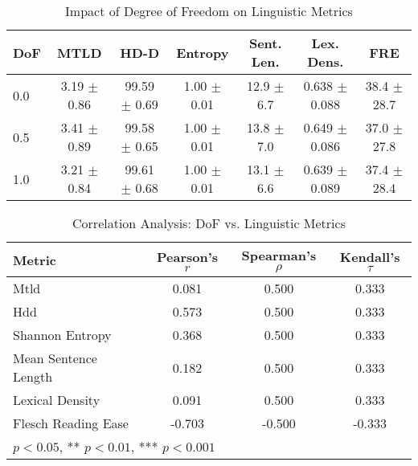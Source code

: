 \begin{table}[htbp]
\centering
\caption{Impact of Degree of Freedom on Linguistic Metrics}
\label{tab:dof_metrics}
\begin{tabular}{lcccccc}
\toprule
DoF & MTLD & HD-D & Entropy & Sent. Len. & Lex. Dens. & FRE \\
\midrule
0.0 & 3.19 $\pm$ 0.86 & 99.59 $\pm$ 0.69 & 1.00 $\pm$ 0.01 & 12.9 $\pm$ 6.7 & 0.638 $\pm$ 0.088 & 38.4 $\pm$ 28.7 \\
0.5 & 3.41 $\pm$ 0.89 & 99.58 $\pm$ 0.65 & 1.00 $\pm$ 0.01 & 13.8 $\pm$ 7.0 & 0.649 $\pm$ 0.086 & 37.0 $\pm$ 27.8 \\
1.0 & 3.21 $\pm$ 0.84 & 99.61 $\pm$ 0.68 & 1.00 $\pm$ 0.01 & 13.1 $\pm$ 6.6 & 0.639 $\pm$ 0.089 & 37.4 $\pm$ 28.4 \\
\bottomrule
\end{tabular}
\end{table}

\begin{table}[htbp]
\centering
\caption{Correlation Analysis: DoF vs. Linguistic Metrics}
\label{tab:correlations}
\begin{tabular}{lccc}
\toprule
Metric & Pearson's $r$ & Spearman's $\rho$ & Kendall's $\tau$ \\
\midrule
Mtld & 0.081 & 0.500 & 0.333 \\
Hdd & 0.573 & 0.500 & 0.333 \\
Shannon Entropy & 0.368 & 0.500 & 0.333 \\
Mean Sentence Length & 0.182 & 0.500 & 0.333 \\
Lexical Density & 0.091 & 0.500 & 0.333 \\
Flesch Reading Ease & -0.703 & -0.500 & -0.333 \\
\bottomrule
\multicolumn{4}{l}{\footnotesize * $p < 0.05$, ** $p < 0.01$, *** $p < 0.001$} \\
\end{tabular}
\end{table}
